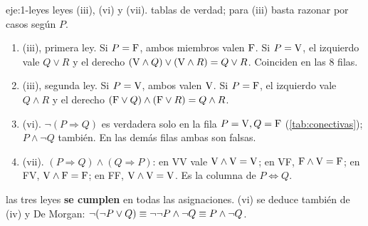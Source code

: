 \begin{solucion}{eje:1-leyes}
\datos leyes (iii), (vi) y (vii).
\planteamiento tablas de verdad; para (iii) basta razonar por casos según $P$.
\pasos
\begin{enumerate}[label=\arabic*.]
  \item (iii), primera ley. Si $P=\mathrm{F}$, ambos miembros valen $\mathrm{F}$. Si $P=\mathrm{V}$, el izquierdo vale $Q\vee R$ y el derecho $(\mathrm{V}\wedge Q)\vee(\mathrm{V}\wedge R)=Q\vee R$. Coinciden en las 8 filas.
  \item (iii), segunda ley. Si $P=\mathrm{V}$, ambos valen $\mathrm{V}$. Si $P=\mathrm{F}$, el izquierdo vale $Q\wedge R$ y el derecho $(\mathrm{F}\vee Q)\wedge(\mathrm{F}\vee R)=Q\wedge R$.
  \item (vi). $\neg(P\Rightarrow Q)$ es verdadera solo en la fila $P=\mathrm{V},Q=\mathrm{F}$ (\cref{tab:conectivas}); $P\wedge\neg Q$ también. En las demás filas ambas son falsas.
  \item (vii). $(P\Rightarrow Q)\wedge(Q\Rightarrow P)$: en VV vale $\mathrm{V}\wedge\mathrm{V}=\mathrm{V}$; en VF, $\mathrm{F}\wedge\mathrm{V}=\mathrm{F}$; en FV, $\mathrm{V}\wedge\mathrm{F}=\mathrm{F}$; en FF, $\mathrm{V}\wedge\mathrm{V}=\mathrm{V}$. Es la columna de $P\Leftrightarrow Q$.
\end{enumerate}
\resultado las tres leyes \textbf{se cumplen} en todas las asignaciones.
\comprobacion (vi) se deduce también de (iv) y De Morgan: $\neg(\neg P\vee Q)\equiv\neg\neg P\wedge\neg Q\equiv P\wedge\neg Q$.
\end{solucion}

